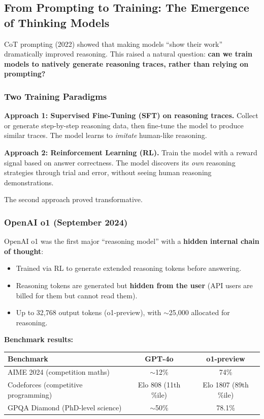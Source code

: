 \documentclass[11pt, a4paper]{article}
\theoremstyle{definition}
\theoremstyle{plain}
\begin{document}
\subsection{From Prompting to Training: The Emergence of Thinking Models}
\label{subsec:thinking-models}

CoT prompting (2022) showed that making models ``show their work'' dramatically improved reasoning. This raised a natural question: \textbf{can we train models to natively generate reasoning traces, rather than relying on prompting?}

\subsubsection{Two Training Paradigms}

\textbf{Approach 1: Supervised Fine-Tuning (SFT) on reasoning traces.}
Collect or generate step-by-step reasoning data, then fine-tune the model to produce similar traces. The model learns to \emph{imitate} human-like reasoning.

\textbf{Approach 2: Reinforcement Learning (RL).}
Train the model with a reward signal based on answer correctness. The model discovers its \emph{own} reasoning strategies through trial and error, without seeing human reasoning demonstrations.

The second approach proved transformative.

\subsubsection{OpenAI o1 (September 2024)}

OpenAI o1 was the first major ``reasoning model'' with a \textbf{hidden internal chain of thought}:
\begin{itemize}
  \item Trained via RL to generate extended reasoning tokens before answering.
  \item Reasoning tokens are generated but \textbf{hidden from the user} (API users are billed for them but cannot read them).
  \item Up to 32,768 output tokens (o1-preview), with ${\sim}$25,000 allocated for reasoning.
\end{itemize}

\textbf{Benchmark results:}
\begin{center}
\begin{tabular}{lcc}
  \toprule
  \textbf{Benchmark} & \textbf{GPT-4o} & \textbf{o1-preview} \\
  \midrule
  AIME 2024 (competition maths) & ${\sim}$12\% & 74\% \\
  Codeforces (competitive programming) & Elo 808 (11th \%ile) & Elo 1807 (89th \%ile) \\
  GPQA Diamond (PhD-level science) & ${\sim}$50\% & 78.1\% \\
  \bottomrule
\end{tabular}
\end{center}
\end{document}
